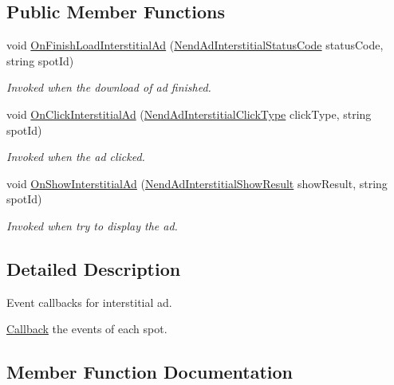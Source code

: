 \subsection*{Public Member Functions}
\begin{DoxyCompactItemize}
\item 
void \hyperlink{interface_nend_unity_plugin_1_1_callback_1_1_nend_ad_interstitial_callback_with_spot_a84b04e9b256cf0464683badcd7139586}{On\+Finish\+Load\+Interstitial\+Ad} (\hyperlink{namespace_nend_unity_plugin_1_1_callback_a439eb407799e3077fd18b7f3809f68d6}{Nend\+Ad\+Interstitial\+Status\+Code} status\+Code, string spot\+Id)
\begin{DoxyCompactList}\small\item\em Invoked when the download of ad finished. \end{DoxyCompactList}\item 
void \hyperlink{interface_nend_unity_plugin_1_1_callback_1_1_nend_ad_interstitial_callback_with_spot_a721b32800768700bf731fc6295af0094}{On\+Click\+Interstitial\+Ad} (\hyperlink{namespace_nend_unity_plugin_1_1_callback_a66432900696cae54e04798d6f3a3892d}{Nend\+Ad\+Interstitial\+Click\+Type} click\+Type, string spot\+Id)
\begin{DoxyCompactList}\small\item\em Invoked when the ad clicked. \end{DoxyCompactList}\item 
void \hyperlink{interface_nend_unity_plugin_1_1_callback_1_1_nend_ad_interstitial_callback_with_spot_ad06fde1e02c73ccf643c6184a8e01768}{On\+Show\+Interstitial\+Ad} (\hyperlink{namespace_nend_unity_plugin_1_1_callback_acda9f80521c8e1306a784491859fa2aa}{Nend\+Ad\+Interstitial\+Show\+Result} show\+Result, string spot\+Id)
\begin{DoxyCompactList}\small\item\em Invoked when try to display the ad. \end{DoxyCompactList}\end{DoxyCompactItemize}


\subsection{Detailed Description}
Event callbacks for interstitial ad. 

\hyperlink{namespace_nend_unity_plugin_1_1_callback}{Callback} the events of each spot.

\subsection{Member Function Documentation}
\hypertarget{interface_nend_unity_plugin_1_1_callback_1_1_nend_ad_interstitial_callback_with_spot_a721b32800768700bf731fc6295af0094}{}

